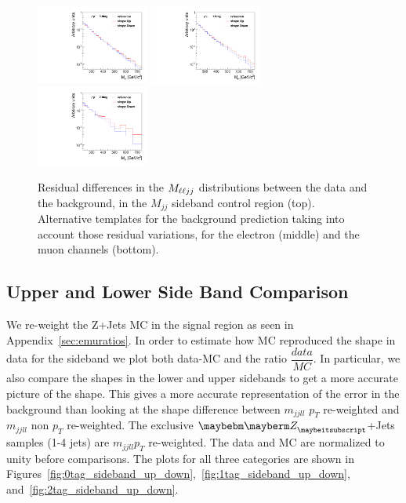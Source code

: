 \begin{figure}[htb]
\begin{center}
{}
\centerline{
\includegraphics[width=0.33\textwidth]{plots/SBres-mm-0b.pdf}
\includegraphics[width=0.33\textwidth]{plots/SBres-mm-1b.pdf}
\includegraphics[width=0.33\textwidth]{plots/SBres-mm-2b.pdf}
}
\caption{Residual differences in the $M_{\ell\ell jj}$ distributions between the data and the background, in the
$M_{jj}$ sideband control region (top). Alternative templates for the background prediction taking into account those residual variations, for the electron (middle) and the muon channels (bottom).    
}
\label{fig:sysshaperes}
\end{center}
\end{figure}



\subsection{Upper and Lower Side Band Comparison}
\label{sec:upandlowersideband}
We re-weight the Z+Jets MC in the signal region as seen in Appendix~\ref{sec:emuratios}. In order to estimate how MC reproduced the shape in data for the sideband we plot both data-MC and the ratio $\dfrac{data}{MC}$.  In particular, we also compare the shapes in the lower and upper sidebands to get a more accurate picture of the shape. This gives a more accurate representation of the error in the background than looking at the shape difference between $m_{jjll}$ $p_{T}$ re-weighted and $m_{jjll}$ non $p_{T}$ re-weighted. The exclusive $\PZ$+Jets samples (1-4 jets) are $m_{jjll} p_{T}$ re-weighted.  The data and MC are normalized to unity before comparisons. The plots for all three categories are shown in Figures~\ref{fig:0tag_sideband_up_down},~\ref{fig:1tag_sideband_up_down}, and~\ref{fig:2tag_sideband_up_down}.  

